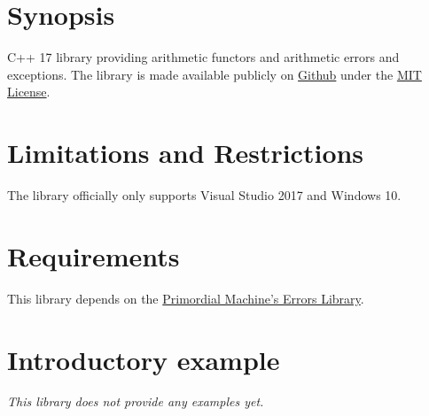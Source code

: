 \documentclass[oneside]{report}
\begin{document}
\maketitle
\tableofcontents
\chapter*{Synopsis}
C++ 17 library providing arithmetic functors and arithmetic errors and exceptions.
The library is made available publicly on
\href{\GetLibraryRepository}{Github}
under the
\href{\GetLibraryRepository/blob/master/LICENSE}{MIT License}.

\chapter{Limitations and Restrictions}
The library officially only supports Visual Studio 2017 and Windows 10.

\chapter{Requirements}
This library depends on the \href{https://github.com/primordialmachine/errors}{Primordial Machine's Errors Library}.

\chapter{Introductory example}
\textit{\color{orange}This library does not provide any examples yet.}
\end{document}
